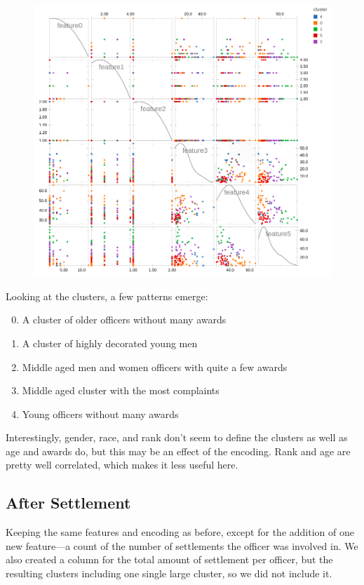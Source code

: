 \documentclass{article}
\begin{document}
\begin{figure}[h!]
\centering
\includegraphics[width=\textwidth]{cluster.png}
\end{figure}
Looking at the clusters, a few patterns emerge:
\begin{enumerate}
\setcounter{enumi}{-1}
\item{A cluster of older officers without many awards}
\item{A cluster of highly decorated young men}
\item{Middle aged men and women officers with quite a few awards}
\item{Middle aged cluster with the most complaints}
\item{Young officers without many awards}
\end{enumerate}
Interestingly, gender, race, and rank don't seem to define the clusters as well as age and awards do, but this may be an effect of the encoding. Rank and age are pretty well correlated, which makes it less useful here.

\FloatBarrier

\subsection{After Settlement}
Keeping the same features and encoding as before, except for the addition of one new feature---a count of the number of settlements the officer was involved in. We also created a column for the total amount of settlement per officer, but the resulting clusters including one single large cluster, so we did not include it.
\end{document}
